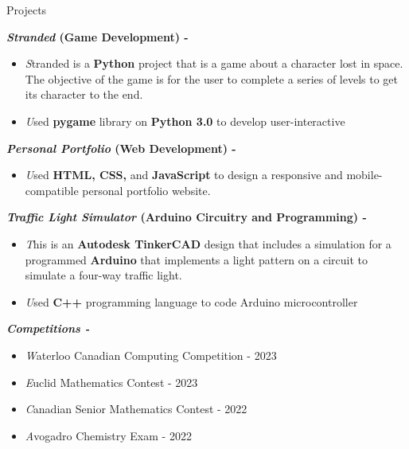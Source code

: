 \documentclass[
	10pt, %
]{resume} %
\begin{document}
\begin{rSection}{Projects}

	\textbf{\textit{Stranded} (Game Development) - }
    \begin{itemize}
            \item \textit Stranded is a \textbf{Python} project that is a game about a character lost in space. The objective of the game is for the user to complete a series of levels to get its character to the end.
            \item \textit Used \textbf{pygame} library on \textbf{Python 3.0} to develop user-interactive 
        \end{itemize}

    \textbf{\textit{Personal Portfolio} (Web Development) - }
    \begin{itemize}
            \item \textit Used \textbf{HTML, CSS, }and \textbf{JavaScript} to design a responsive and mobile-compatible personal portfolio website.
        \end{itemize}

    \textbf{\textit{Traffic Light Simulator} (Arduino Circuitry and Programming) - }
    \begin{itemize}
            \item \textit This is an \textbf{Autodesk TinkerCAD} design that includes a simulation for a programmed \textbf{Arduino} that implements a light pattern on a circuit to simulate a four-way traffic light. 
            \item \textit Used \textbf{C++} programming language to code Arduino microcontroller
        \end{itemize}

    \textbf{\textit{Competitions - }}
    \begin{itemize}
            \item \textit Waterloo Canadian Computing Competition - 2023
            \item \textit Euclid Mathematics Contest - 2023
            \item \textit Canadian Senior Mathematics Contest - 2022
            \item \textit Avogadro Chemistry Exam - 2022
        \end{itemize}
        
\end{rSection}

\end{document}
